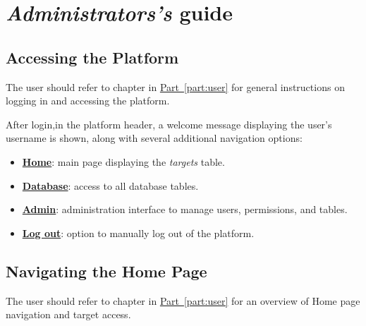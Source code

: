 
\part{\textsl{Administrators's} guide} \label{part:admin}

  
\chapter{Accessing the Platform}

The \admin user should refer to chapter \hyperref[chap:user-access]{} in \hyperref[part:user]{Part~\ref*{part:user}} for general instructions on logging in and accessing the platform. 

After login,in the platform header, a welcome message displaying the \admin user's username is shown, along with several additional navigation options:

\begin{itemize}
   	\item \textbf{\hyperref[chap:admin-homepage]{Home}}: main page displaying the \textit{targets} table.
   	\item \textbf{\hyperref[chap:admin-database]{Database}}: access to all database tables.
   	\item \textbf{\hyperref[chap:admin-panel]{Admin}}: administration interface to manage users, permissions, and tables.
   	\item \textbf{\hyperref[chap:admin-logout]{Log out}}: option to manually log out of the platform.
\end{itemize}

    

\chapter{Navigating the Home Page} \label{chap:admin-homepage}

The \admin user should refer to chapter \hyperref[chap:user-homepage]{} in \hyperref[part:user]{Part~\ref*{part:user}} for an overview of Home page navigation and target access.





